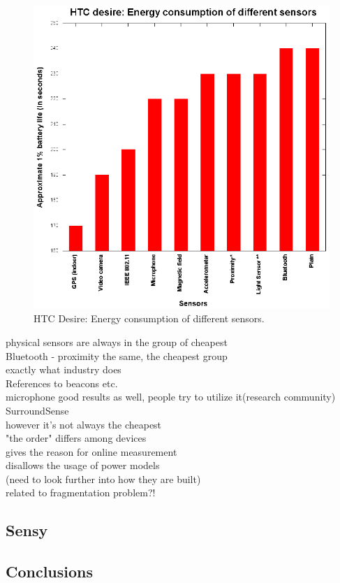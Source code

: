 \begin{figure}[H]
\centering
\includegraphics[scale=1.5]{plots/htc_desire.eps}
\caption{HTC Desire: Energy  consumption of different sensors.}
\end{figure}

physical sensors are always in the group of cheapest \\

Bluetooth - proximity the same, the cheapest group\\
				exactly what industry does\\
				References to beacons etc.\\

microphone good results as well, people try to utilize it(research community)\\
				SurroundSense \cite{azizyan:surroundsense}\\
				however it's not always the cheapest\\
				
				
"the order" differs among devices\\
	gives the reason for online measurement\\
	disallows the usage of power models\\
		(need to look further into how they are built)\\
	related to fragmentation problem?!\\
								
\subsection{Sensy}
\subsection{Conclusions}